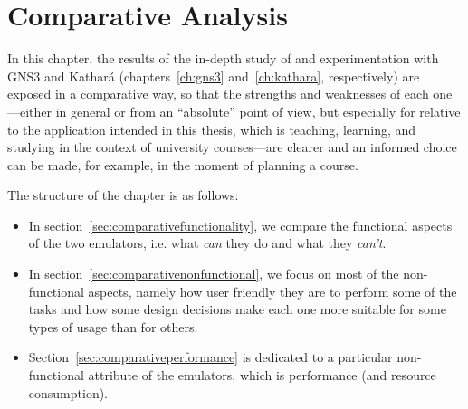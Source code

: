 
\chapter{Comparative Analysis}
\label{ch:comparative}

In this chapter, the results of the in-depth study of and experimentation with GNS3 and Kathará (chapters~\ref{ch:gns3} and~\ref{ch:kathara}, respectively) are exposed in a comparative way, so that the strengths and weaknesses of each one---either in general or from an ``absolute'' point of view, but especially for relative to the application intended in this thesis, which is teaching, learning, and studying in the context of university courses---are clearer and an informed choice can be made, for example, in the moment of planning a course.

The structure of the chapter is as follows:
\begin{itemize}
  \item In section~\ref{sec:comparativefunctionality}, we compare the functional aspects of the two emulators, i.e. what \emph{can} they do and what they \emph{can't}.
  \item In section~\ref{sec:comparativenonfunctional}, we focus on most of the non-functional aspects, namely how user friendly they are to perform some of the tasks and how some design decisions make each one more suitable for some types of usage than for others.
  \item Section~\ref{sec:comparativeperformance} is dedicated to a particular non-functional attribute of the emulators, which is performance (and resource consumption).
\end{itemize}







